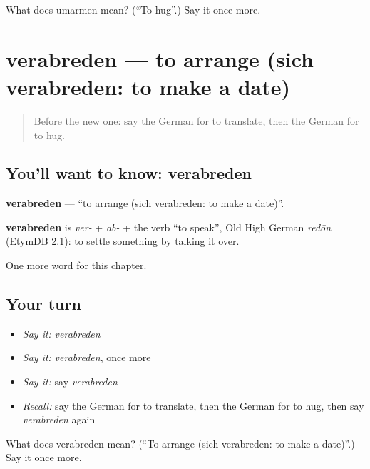 \begin{tcolorbox}[breakable,colback=teal!4,colframe=teal!35!black,title={Before you move on}]
What does umarmen mean? (\textquotedblleft{}To hug\textquotedblright{}.) Say it once more.
\end{tcolorbox}
\section[verabreden]{verabreden — to arrange (sich verabreden: to make a date)}

\label{lesson:GE-C189-verabreden}



\begin{quote}
Before the new one: say the German for to translate, then the German for to hug.
\end{quote}

\subsection*{You'll want to know: verabreden}
\textbf{verabreden} — \textquotedblleft{}to arrange (sich verabreden: to make a date)\textquotedblright{}.

\begin{cousinweb}
\textbf{verabreden} is \emph{ver-} + \emph{ab-} + the verb \textquotedblleft{}to speak\textquotedblright{}, Old High German \emph{redōn} (EtymDB 2.1): to settle something by talking it over.
\end{cousinweb}

\begin{grammarlens}[title={What you've built}]
One more word for this chapter.
\end{grammarlens}

\subsection*{Your turn}
\begin{itemize}
\raggedright
  \item \emph{Say it:} \emph{verabreden}
  \item \emph{Say it:} \emph{verabreden}, once more
  \item \emph{Say it:} say \emph{verabreden}
  \item \emph{Recall:} say the German for to translate, then the German for to hug, then say \emph{verabreden} again
\end{itemize}

\begin{tcolorbox}[breakable,colback=teal!4,colframe=teal!35!black,title={Before you move on}]
What does verabreden mean? (\textquotedblleft{}To arrange (sich verabreden: to make a date)\textquotedblright{}.) Say it once more.
\end{tcolorbox}

